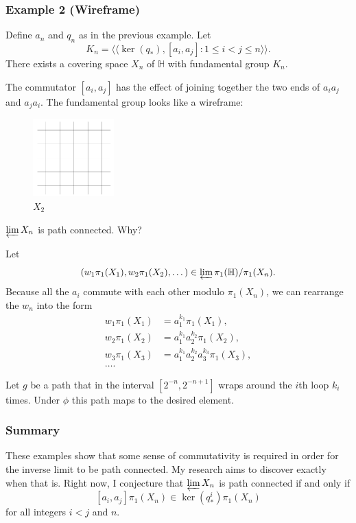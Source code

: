 \documentclass{beamer}
\newcommand{\HE}{\mathbb{H}}
\begin{document}
\begin{frame}[allowframebreaks]
\frametitle{Example 2 (Wireframe)}
Define $a_n$ and $q_n$ as in the previous example.
Let
$$K_n = \langle \langle \ker(q_*), [a_i, a_j] : 1 \le i < j \le n \rangle \rangle.$$
There exists a covering space $X_n$ of $\HE$ with fundamental group $K_n$.

The commutator $[a_i, a_j]$ has the effect of joining together the two ends of $a_ia_j$ and $a_ja_i$.  The fundamental group looks like a wireframe:
\begin{figure}[h]
\centering
\includegraphics[height=3cm]{images/wireframe.pdf}
\caption{$X_2$}
\end{figure}

\pagebreak

$\varprojlim X_n$ is path connected.  Why?

Let
$$(w_1 \pi_1(X_1), w_2 \pi_1(X_2), \dots) \in \varprojlim \pi_1(\HE) / \pi_1(X_n).$$
Because all the $a_i$ commute with each other modulo $\pi_1(X_n)$, we can rearrange the $w_n$ into the form
\begin{align*}
w_1 \pi_1(X_1) &= a_1^{k_1} \pi_1(X_1),\\
w_2 \pi_1(X_2) &= a_1^{k_1} a_2^{k_2} \pi_1(X_2),\\
w_3 \pi_1(X_3) &= a_1^{k_1} a_2^{k_2} a_3^{k_3} \pi_1(X_3),\\ 
\dots.
\end{align*}

Let $g$ be a path that in the interval $[2^{-n}, 2^{-n + 1}]$ wraps around the $i$th loop $k_i$ times.  Under $\phi$ this path maps to the desired element.

\end{frame}


\begin{frame}
\frametitle{Summary}
These examples show that some sense of commutativity is required in order for the inverse limit to be path connected.  My research aims to discover exactly when that is.  Right now, I conjecture that $\varprojlim X_n$ is path connected if and only if
$$[a_i, a_j] \pi_1(X_n) \in \ker(q_*^i) \pi_1(X_n)$$
for all integers $i < j$ and $n$.
\end{frame}
\end{document}
